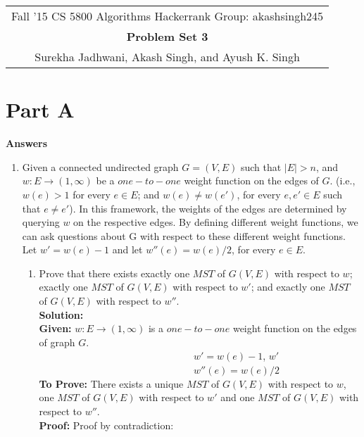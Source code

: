\documentclass[12pt]{article}
\begin{document}
\begin{center}
\begin{tabular}{|c|}
\hline
Fall '15 CS 5800 Algorithms \hspace{5cm} Hackerrank Group: akashsingh245\\
{\bfseries \large Problem Set 3}\\
Surekha Jadhwani, Akash Singh, and Ayush K. Singh\\
\hline
\end{tabular}
\end{center}

\section{Part A}
\textbf{\large{Answers}}
\begin{enumerate}
\item Given a connected undirected graph $G = (V, E)$ such that $|E| > n$, and $w : E → (1, \infty)$ be a $one-to-one$ weight function on the edges of $G$. (i.e., $w(e) > 1$ for every $e \in E$; and $w(e) \ne w(e')$, for every $e,e' \in E$ such that $e \ne e'$). In this framework, the weights of the edges are determined by querying $w$ on the respective edges. By defining different weight functions, we can ask questions about G with respect to these different weight functions.\\
Let $w' =w(e) - 1$ and let $w''(e)=w(e)/2$, for every $e \in E$.
\begin{enumerate}
\item Prove that there exists exactly one $MST$ of $G(V,E)$ with respect to $w$; exactly one $MST$ of $G(V,E)$ with respect to $w'$; and exactly one $MST$ of $G(V,E)$ with respect to $w''$.\\
\textbf{Solution:} \\
\textbf{Given:} $w : E → (1, \infty)$ is a $one-to-one$ weight function on the edges of graph $G$.\\
 \verb|		|\verb|		|\verb|		|\verb|		|\verb|		|\verb|		| $w' =w(e) - 1$, $w'$\\
 \verb|		|\verb|		|\verb|		|\verb|		|\verb|		|\verb|		| $w''(e)=w(e)/2$ \\
\textbf{To Prove:} There exists a unique $MST$ of $G(V,E)$ with respect to $w$, one $MST$ of $G(V,E)$ with respect to $w'$ and one $MST$ of $G(V,E)$ with respect to $w''$.\\
\textbf{Proof:} Proof by contradiction:\\
\begin{enumerate}

\end{enumerate}
\end{enumerate}
\end{enumerate}
\end{document}
